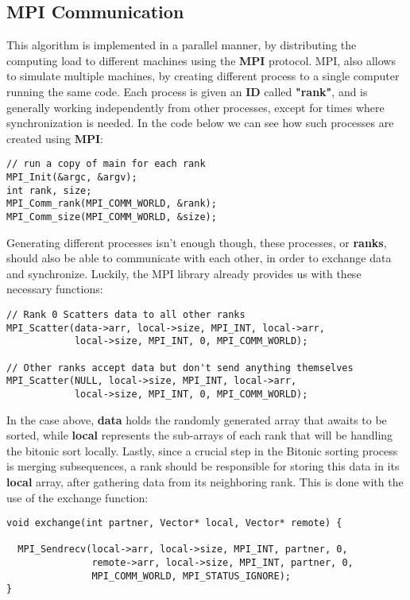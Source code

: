 \documentclass[12pt]{report}
\begin{document}
        \subsection{MPI Communication}
        This algorithm is implemented in a parallel manner, by distributing the computing load to different machines using the \textbf{MPI}
        protocol. MPI, also allows to simulate multiple machines, by creating different process to a single computer running the same code. Each process is given an \textbf{ID} called \textbf{"rank"}, and is generally working independently from other processes, except for times where synchronization is needed. In the code below we can see how such processes are created using \textbf{MPI}:
        \begin{lstlisting}[style=cstyle]
// run a copy of main for each rank
MPI_Init(&argc, &argv);
int rank, size;
MPI_Comm_rank(MPI_COMM_WORLD, &rank);
MPI_Comm_size(MPI_COMM_WORLD, &size);
        \end{lstlisting}\newpage
        Generating different processes isn't enough though, these processes, or \textbf{ranks}, should also be able to communicate with each other, in order to exchange data and synchronize. Luckily, the MPI library already provides us with these necessary functions: 
        \begin{lstlisting}[style=cstyle]
// Rank 0 Scatters data to all other ranks
MPI_Scatter(data->arr, local->size, MPI_INT, local->arr,
            local->size, MPI_INT, 0, MPI_COMM_WORLD);

// Other ranks accept data but don't send anything themselves
MPI_Scatter(NULL, local->size, MPI_INT, local->arr, 
            local->size, MPI_INT, 0, MPI_COMM_WORLD);
        \end{lstlisting}
        In the case above, \textbf{data} holds the randomly generated array that awaits to be sorted, while \textbf{local} represents the sub-arrays of each rank that will be handling the bitonic sort locally.
        \vfill
        Lastly, since a crucial step in the Bitonic sorting process is merging subsequences, a rank should be responsible for storing this data in its \textbf{local} array, after gathering data from its neighboring rank. This is done with the use of the exchange function:
        \begin{lstlisting}[style=cstyle]
void exchange(int partner, Vector* local, Vector* remote) {

  MPI_Sendrecv(local->arr, local->size, MPI_INT, partner, 0,
               remote->arr, local->size, MPI_INT, partner, 0,
               MPI_COMM_WORLD, MPI_STATUS_IGNORE);
}
        \end{lstlisting}
\end{document}
